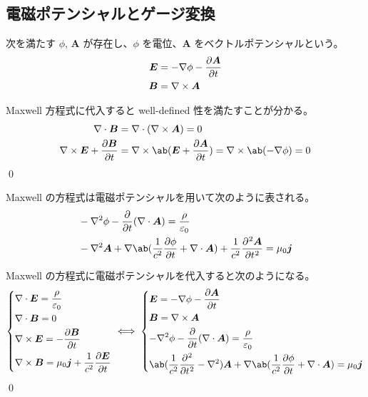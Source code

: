 \documentclass[uplatex,dvipdfmx,a4paper,11pt]{jlreq}
\makeatletter
\newcommand{\EE}{\bm{E}}
\newcommand{\BB}{\bm{B}}
\renewcommand{\AA}{\bm{A}}
\newcommand{\vnabla}{\mathbf{\nabla}}
\newcommand{\laplacian}{\nabla^2}
\numberwithin{equation}{section}
\theoremstyle{definition}
\renewenvironment{proof}[1][\proofname]{\par
  \normalfont
  \topsep6\p@\@plus6\p@ \trivlist
  \item[\hskip\labelsep{\bfseries #1}\@addpunct{\bfseries}]\ignorespaces\quad\par
}{%
  \qed\endtrivlist\@endpefalse
}
\renewcommand\proofname{証明}
\makeatother
\begin{document}
\subsection{電磁ポテンシャルとゲージ変換}
\begin{definition}[電磁ポテンシャル]
  次を満たす $\phi$, $\AA$ が存在し、$\phi$ を電位、$\AA$ をベクトルポテンシャルという。
  \begin{align}
    \EE & = - \vnabla\phi - \diffp{\AA}{t} \\
    \BB & = \vnabla\times\AA
  \end{align}
\end{definition}
\begin{proof}
  Maxwell 方程式に代入すると well-defined 性を満たすことが分かる。
  \begin{align}
    \vnabla\cdot\BB                   & = \vnabla\cdot(\vnabla\times\AA) = 0                                          \\
    \vnabla\times\EE + \diffp{\BB}{t} & = \vnabla\times\ab(\EE + \diffp{\AA}{t}) = \vnabla\times\ab(-\vnabla\phi) = 0
  \end{align}
\end{proof}

\begin{theorem}
  Maxwell の方程式は電磁ポテンシャルを用いて次のように表される。
  \begin{align}
     & -\laplacian\phi - \diffp{}{t}(\vnabla\cdot\AA) = \frac{\rho}{\varepsilon_0}                                                \\
     & -\laplacian\AA + \vnabla\ab(\frac{1}{c^2}\diffp{\phi}{t} + \vnabla\cdot\AA) + \frac{1}{c^2}\diffp[2]{\AA}{t} = \mu_0\bm{j}
  \end{align}
\end{theorem}
\begin{proof}
  Maxwell の方程式に電磁ポテンシャルを代入すると次のようになる。
  \begin{align}
    \begin{dcases}
      \vnabla\cdot\EE  = \frac{\rho}{\varepsilon_0} \\
      \vnabla\cdot\BB  = 0                          \\
      \vnabla\times\EE = -\diffp{\BB}{t}            \\
      \vnabla\times\BB = \mu_0\bm{j} + \frac{1}{c^2}\diffp{\EE}{t}
    \end{dcases}
    \iff
    \begin{dcases}
      \EE = - \vnabla\phi - \diffp{\AA}{t}                                        \\
      \BB = \vnabla\times\AA                                                      \\
      -\laplacian\phi - \diffp{}{t}(\vnabla\cdot\AA) = \frac{\rho}{\varepsilon_0} \\
      \ab(\frac{1}{c^2}\diffp[2]{}{t} - \laplacian)\AA + \vnabla\ab(\frac{1}{c^2}\diffp{\phi}{t} + \vnabla\cdot\AA) = \mu_0\bm{j}
    \end{dcases}
  \end{align}
\end{proof}
\end{document}
